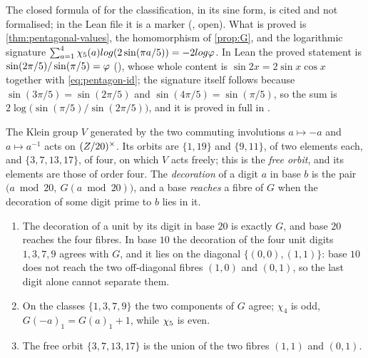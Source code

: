 \begin{remark}\label{rmk:grisales-not-verified}
The closed formula of \cite{grisales25} for the classification, in its sine form,
is cited and not formalised; in the Lean file it is a marker
(, open).  What is proved is
\cref{thm:pentagonal-values}, the homomorphism of \cref{prop:G}, and the
logarithmic signature $\sum_{a=1}^4\chi_5(a)log(2\sin(\pi a/5))=-2log\varphi$.  In
Lean the proved statement is $\sin(2\pi/5)/\sin(\pi/5)=\varphi$
(), whose whole content is
$\sin2x=2\sin x\cos x$ together with \eqref{eq:pentagon-id}; the signature itself follows
because $\sin(3\pi/5)=\sin(2\pi/5)$ and $\sin(4\pi/5)=\sin(\pi/5)$, so the sum is
$2\log\bigl(\sin(\pi/5)/\sin(2\pi/5)\bigr)$, and it is proved in full in
.
\end{remark}

The Klein group $V$ generated by the two commuting involutions $a\mapsto-a$ and $a\mapsto a^{-1}$ acts on $(Z/20)^{\times}$.
Its orbits are $\{1,19\}$ and $\{9,11\}$, of two elements each, and $\{3,7,13,17\}$, of four, on which $V$ acts
freely; this is the \emph{free orbit}, and its elements are those of order four.  The \emph{decoration} of a
digit $a$ in base $b$ is the pair $\bigl(a\bmod20,\ G(a\bmod20)\bigr)$, and a base \emph{reaches} a fibre of $G$ when
the decoration of some digit prime to $b$ lies in it.

\begin{proposition}\label{prop:base-twenty}
\begin{enumerate}[label=\textup{(\roman*)}]
  \item The decoration of a unit by its digit in base $20$ is exactly $G$, and base $20$ reaches the four fibres.
    In base $10$ the decoration of the four unit digits $1,3,7,9$ agrees with $G$, and it lies on the diagonal
    $\{(0,0),(1,1)\}$: base $10$ does not reach the two off-diagonal fibres $(1,0)$ and $(0,1)$, so the last
    digit alone cannot separate them.
  \item On the classes $\{1,3,7,9\}$ the two components of $G$ agree; $\chi_4$ is odd,
    $G(-a)_1=G(a)_1+1$, while $\chi_5$ is even.
  \item The free orbit $\{3,7,13,17\}$ is the union of the two fibres $(1,1)$ and $(0,1)$.
\end{enumerate}
\end{proposition}

